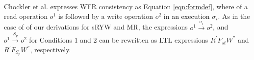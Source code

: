 \documentclass[journal,compsoc]{IEEEtran}
\begin{document}
\par  Chockler et al. expresses WFR consistency as Equation \ref{eqn:formdef},  %
  where of a read operation
   $\mathit{o}^1$ is followed by a write operation  $\mathit{o}^2$ in an execution $\sigma_i$. %
   As in the case of of our derivations for sRYW and MR, the expressions $\mathit{o}^1 \xrightarrow{\sigma_i} \mathit{o}^2$,
  and $\mathit{o}^1 \xrightarrow{S_p} \mathit{o}^2$ for Conditions 1 and 2  can be rewritten as LTL expressions
   $R^{'} F_\mathit{st} W^{''}$ and $R^{'} F_{S_p} W^{''} $, respectively.  %
\end{document}
